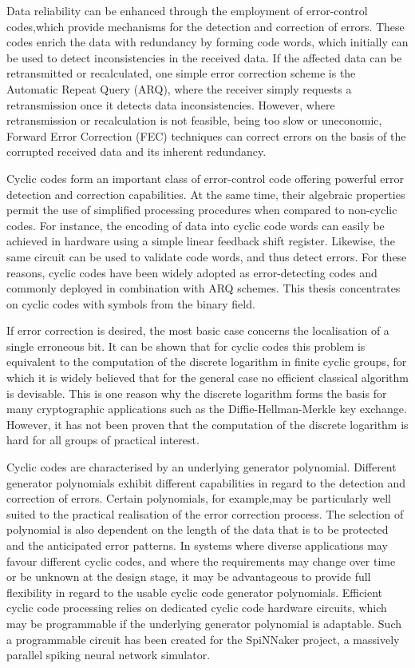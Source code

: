\documentclass[a4paper, 11pt]{article}
\begin{document}
Data reliability can be enhanced through the employment of error-control codes,which provide mechanisms for the detection and correction of errors. These codes enrich the data with redundancy by forming code words, which initially can be used to detect inconsistencies in the received data. If the affected data can be retransmitted or recalculated, one simple error correction scheme is the Automatic Repeat Query (ARQ), where the receiver simply requests a retransmission once it detects data inconsistencies. However, where retransmission or recalculation is not feasible, being too slow or uneconomic, Forward Error Correction (FEC) techniques can correct errors on the basis of the corrupted received data and its inherent redundancy.

Cyclic codes form an important class of error-control code offering powerful error detection and correction capabilities. At the same time, their algebraic properties permit the use of simplified processing procedures when compared to non-cyclic codes. For instance, the encoding of data into cyclic code words can easily be achieved in hardware using a simple linear feedback shift register. Likewise, the same circuit can be used to validate code words, and thus detect errors. For these reasons, cyclic codes have been widely adopted as error-detecting codes and commonly deployed in combination with ARQ schemes. This thesis concentrates on cyclic codes with symbols from the binary field.

If error correction is desired, the most basic case concerns the localisation of a single erroneous bit. It can be shown that for cyclic codes this problem is equivalent to the computation of the discrete logarithm in finite cyclic groups, for which it is widely believed that for the general case no efficient classical algorithm is devisable. This is one reason why the discrete logarithm forms the basis for many cryptographic applications such as the Diffie-Hellman-Merkle key exchange. However, it has not been proven that the computation of the discrete logarithm is hard for all groups of practical interest.

Cyclic codes are characterised by an underlying generator polynomial. Different generator polynomials exhibit different capabilities in regard to the detection and correction of errors. Certain polynomials, for example,may be particularly well suited to the practical realisation of the error correction process. The selection of polynomial is also dependent on the length of the data that is to be protected and the anticipated error patterns. In systems where diverse applications may favour different cyclic codes, and where the requirements may change over time or be unknown at the design stage, it may be advantageous to provide full flexibility in regard to the usable cyclic code generator polynomials. Efficient cyclic code processing relies on dedicated cyclic code hardware circuits, which may be programmable if the underlying generator polynomial is adaptable. Such a programmable circuit has been created for the SpiNNaker project, a massively parallel spiking neural network simulator.
\end{document}
